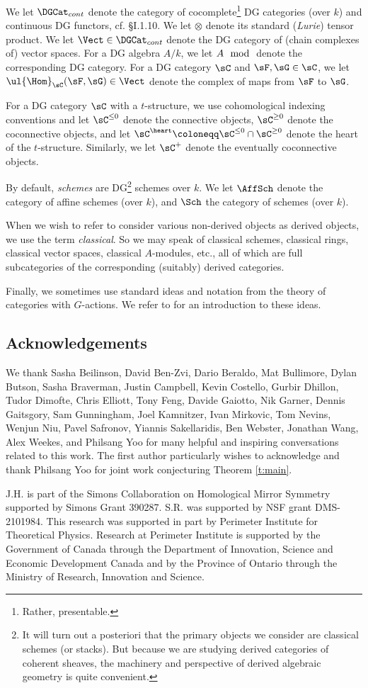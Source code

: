 We let $\DGCat_{cont}$ denote the category of cocomplete\footnote{Rather, presentable.}
DG categories (over $k$) and continuous DG functors, cf. \cite{grbook} \S I.1.10.
We let $\otimes$ denote its standard (\emph{Lurie}) tensor product.
We let $\Vect \in \DGCat_{cont}$ denote the DG category of (chain complexes
of) vector spaces. For a DG algebra $A/k$, we let $A\mod$ denote the
corresponding DG category.
For a DG category $\sC$ and $\sF,\sG \in \sC$, we let
$\ul{\Hom}_{\sC}(\sF,\sG) \in \Vect$ denote the complex of
maps from $\sF$ to $\sG$.

For a DG category $\sC$ with a $t$-structure, we use cohomological
indexing conventions and let $\sC^{\leq 0}$ denote the connective
objects, $\sC^{\geq 0}$ denote the coconnective objects, and
let $\sC^{\heart} \coloneqq \sC^{\leq 0} \cap \sC^{\geq 0}$ denote
the heart of the $t$-structure. Similarly, we let
$\sC^+$ denote the eventually coconnective objects.


By default, \emph{schemes} are DG\footnote{It will turn out a posteriori
that the primary objects
we consider are classical schemes (or stacks). But because we are studying
derived categories of coherent sheaves, the machinery and perspective of derived
algebraic geometry is quite convenient.}
 schemes over $k$. We let
$\AffSch$ denote the category of affine schemes (over $k$),
and $\Sch$ the category of schemes (over $k$).

When we wish to refer to consider various non-derived objects as
derived objects, we use the
term \emph{classical}. So we may speak of classical schemes, classical rings,
classical vector spaces, classical $A$-modules, etc., all of which
are full subcategories of the corresponding (suitably) derived categories.

Finally, we sometimes use standard ideas and notation from the theory of
categories with $G$-actions. We refer to \cite{dario} for an introduction
to these ideas.

\subsection{Acknowledgements}

We thank Sasha Beilinson, David Ben-Zvi, Dario Beraldo,
Mat Bullimore, Dylan Butson, Sasha Braverman,
Justin Campbell, Kevin Costello, Gurbir Dhillon, Tudor Dimofte, Chris Elliott,
Tony Feng, Davide Gaiotto, Nik Garner, Dennis Gaitsgory, Sam Gunningham,
Joel Kamnitzer, Ivan Mirkovic, Tom Nevins, Wenjun Niu, Pavel Safronov,
Yiannis Sakellaridis, Ben Webster, Jonathan Wang, Alex Weekes, and
Philsang Yoo for many helpful and inspiring conversations related
to this work. The first author particularly wishes to acknowledge and thank
Philsang Yoo for joint work conjecturing Theorem \ref{t:main}.

J.H. is part of the Simons Collaboration on Homological Mirror Symmetry supported by
Simons Grant 390287. S.R. was supported by NSF grant DMS-2101984.
This research was supported in part by Perimeter Institute for Theoretical Physics.
Research at Perimeter Institute is supported by the Government of Canada through the
Department of Innovation, Science and Economic Development Canada and by the Province of
Ontario through the Ministry of Research, Innovation and Science.
